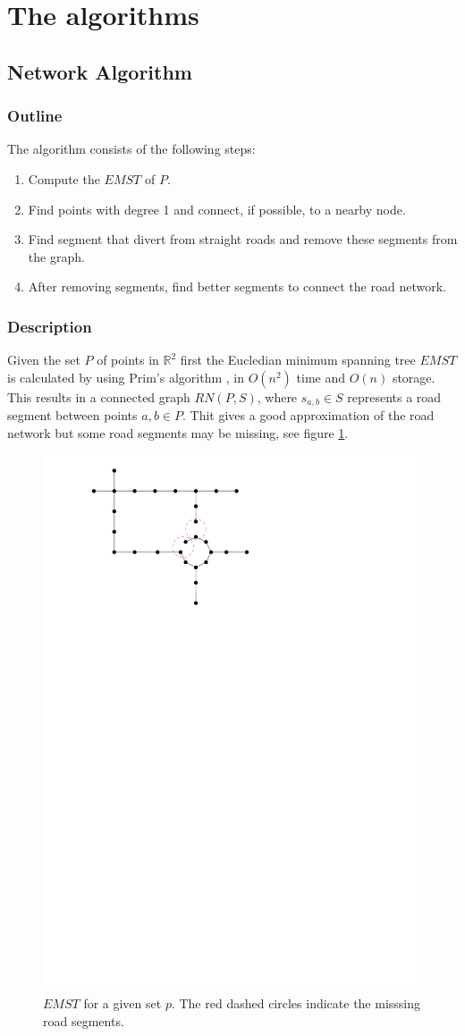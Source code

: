 \documentclass[11pt]{article}
\begin{document}
\section{The algorithms}
\label{se:algorithms}
\subsection{Network Algorithm}
\subsubsection{Outline}
The algorithm consists of the following steps:
\begin{enumerate}
  \item Compute the $EMST$ of $P$.
  \item Find points with degree 1 and connect, if possible, to a nearby node.
  \item Find segment that divert from straight roads and remove these segments from the graph.
  \item After removing segments, find better segments to connect the road network.
\end{enumerate}
  
\subsubsection{Description}
Given the set $P$ of points in $\mathbb{R}^2$ first the Eucledian minimum spanning tree $EMST$ is calculated by using Prim's algorithm \cite{p-scnsg-57}, in $O(n^2)$ time and $O(n)$ storage. This results in a connected graph $RN(P,S)$, where $s_{a,b}\in S$ represents a road segment between points $a,b \in P$. Thit gives a good approximation of the road network but some road segments may be missing, see figure \ref{emst}.

\begin{figure}[h]
  \centering
      \graphicspath{ {images/}}
      \includegraphics[width=0.5\linewidth]{NetworkMST}
      \caption{$EMST$ for a given set $p$. The red dashed circles indicate the misssing road segments.}
      \label{emst}
  \end{figure}
\end{document}
